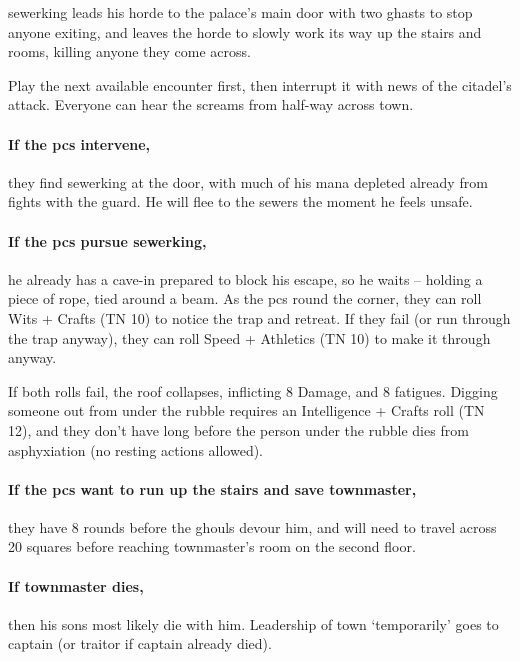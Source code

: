 \Gls{sewerking} leads his horde to the palace's main door with two ghasts to stop anyone exiting, and leaves the horde to slowly work its way up the stairs and rooms, killing anyone they come across.

Play the next available encounter first, then interrupt it with news of the citadel's attack.
Everyone can hear the screams from half-way across \gls{town}.

\paragraph{If the \glspl{pc} intervene,}
they find \gls{sewerking} at the door, with much of his mana depleted already from fights with the guard.
He will flee to the sewers the moment he feels unsafe.

\ghast

\ghast

\sewerking


\paragraph{If the \glspl{pc} pursue \gls{sewerking},}
he already has a cave-in prepared to block his escape, so he waits -- holding a piece of rope, tied around a beam.
As the \glspl{pc} round the corner, they can roll Wits + Crafts (TN 10) to notice the trap and retreat.
If they fail (or run through the trap anyway), they can roll Speed + Athletics (TN 10) to make it through anyway.

If both rolls fail, the roof collapses, inflicting 8 Damage, and 8 \glspl{fatigue}.
Digging someone out from under the rubble requires an Intelligence + Crafts roll (TN 12), and they don't have long before the person under the rubble dies from asphyxiation (no resting actions allowed).

\paragraph{If the \glspl{pc} want to run up the stairs and save \gls{townmaster},}
they have 8 rounds before the ghouls devour him, and will need to travel across 20 squares before reaching \gls{townmaster}'s room on the second floor.

\paragraph{If \gls{townmaster} dies,}
then his sons most likely die with him.
Leadership of \gls{town} `temporarily' goes to \Gls{captain} (or \gls{traitor} if \gls{captain} already died).

\stopcontents[sq]


